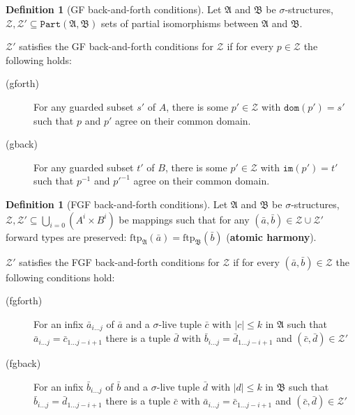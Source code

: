 \documentclass[draft]{scrartcl}
\theoremstyle{definition}
\newtheorem{definition}[theorem]{Definition}
\begin{document}
\begin{definition}[GF back-and-forth conditions]
Let $\mathfrak{A}$ and $\mathfrak{B}$ be $\sigma$-structures, $\mathcal{Z}, \mathcal{Z'} \subseteq \mathtt{Part}(\mathfrak{A}, \mathfrak{B})$ sets of partial isomorphisms between $\mathfrak{A}$ and $\mathfrak{B}$.

$\mathcal{Z'}$ satisfies the GF back-and-forth conditions for $\mathcal{Z}$ if for every $p \in \mathcal{Z}$ the following holds:

\begin{description}
    \item[(gforth)] For any guarded subset $s'$ of $A$, there is some $p' \in \mathcal{Z}$ with $\mathtt{dom}(p') = s'$ such that $p$ and $p'$ agree on their common domain.
    \item[(gback)] For any guarded subset $t'$ of $B$, there is some $p' \in \mathcal{Z}$ with $\mathtt{im}(p') = t'$ such that $p^{-1}$ and $p'^{-1}$ agree on their common domain.
\end{description}
\end{definition}

\begin{definition}[FGF back-and-forth conditions]
Let $\mathfrak{A}$ and $\mathfrak{B}$ be $\sigma$-structures, $\mathcal{Z}, \mathcal{Z'} \subseteq \bigcup_{i=0}(A^i \times B^i)$ be mappings such that for any $(\bar{a}, \bar{b}) \in \mathcal{Z} \cup \mathcal{Z'}$ forward types are preserved: $\mathrm{ftp}_\mathfrak{A}(\bar{a}) = \mathrm{ftp}_\mathfrak{B}(\bar{b})$ (\textbf{atomic harmony}).

$\mathcal{Z'}$ satisfies the FGF back-and-forth conditions for $\mathcal{Z}$ if for every $(\bar{a}, \bar{b}) \in \mathcal{Z}$ the following conditions hold:

\begin{description}
    \item[(fgforth)] For an infix $\bar{a}_{i\ldots{}j}$ of $\bar{a}$ and a $\sigma$-live tuple $\bar{c}$ with $|c| \leq k$ in $\mathfrak{A}$ such that $\bar{a}_{i\ldots{}j} = \bar{c}_{1\ldots{}j-i+1}$ there is a tuple $\bar{d}$ with $\bar{b}_{i\ldots{}j} = \bar{d}_{1\ldots{}j-i+1}$ and $(\bar{c}, \bar{d}) \in \mathcal{Z'}$
    \item[(fgback)] For an infix $\bar{b}_{i\ldots{}j}$ of $\bar{b}$ and a $\sigma$-live tuple $\bar{d}$ with $|d| \leq k$ in $\mathfrak{B}$ such that $\bar{b}_{i\ldots{}j} = \bar{d}_{1\ldots{}j-i+1}$ there is a tuple $\bar{c}$ with $\bar{a}_{i\ldots{}j} = \bar{c}_{1\ldots{}j-i+1}$ and $(\bar{c}, \bar{d}) \in \mathcal{Z'}$
\end{description}
\end{definition}
\end{document}
